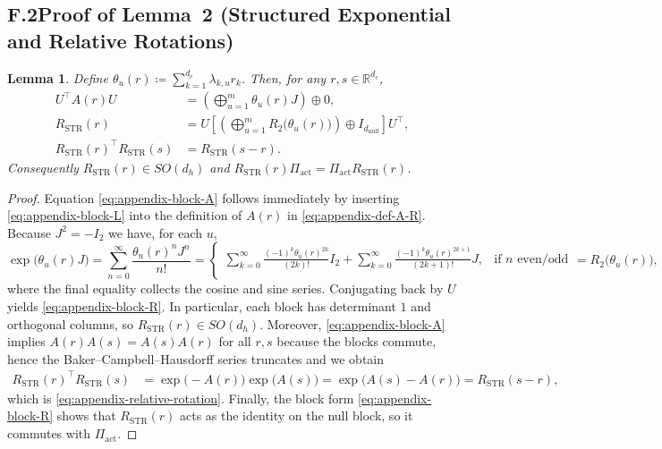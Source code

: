 \documentclass[11pt]{article}
\newcommand{\Real}{\mathbb{R}}
\newtheorem{lemma}{Lemma}
\begin{document}
\subsection*{F.2\quad Proof of Lemma~2 (Structured Exponential and Relative Rotations)}

\begin{lemma}\label{lem:appendix-structured-exponential}
Define $\theta_u(r) \coloneqq \sum_{k=1}^{d_c} \lambda_{k,u} r_k$.  Then, for any $r,s\in\Real^{d_c}$,
\begin{align}
  U^\top A(r) U
    &= \left(\bigoplus_{u=1}^{m} \theta_u(r) J\right) \oplus 0,
     \label{eq:appendix-block-A}\\
  R_{\mathrm{STR}}(r)
    &= U \left[\left(\bigoplus_{u=1}^{m} R_2\big(\theta_u(r)\big)\right) \oplus I_{d_{\mathrm{null}}}\right] U^\top,
     \label{eq:appendix-block-R}\\
  R_{\mathrm{STR}}(r)^\top R_{\mathrm{STR}}(s)
    &= R_{\mathrm{STR}}(s-r).
     \label{eq:appendix-relative-rotation}
\end{align}
Consequently $R_{\mathrm{STR}}(r)\in SO(d_h)$ and $R_{\mathrm{STR}}(r)\Pi_{\mathrm{act}} = \Pi_{\mathrm{act}} R_{\mathrm{STR}}(r)$.
\end{lemma}

\begin{proof}
Equation \eqref{eq:appendix-block-A} follows immediately by inserting \eqref{eq:appendix-block-L} into the definition
of $A(r)$ in \eqref{eq:appendix-def-A-R}.  Because $J^2 = -I_2$ we have, for each $u$,
\[
  \exp\!\big(\theta_u(r) J\big)
  = \sum_{n=0}^\infty \frac{\theta_u(r)^n J^n}{n!}
  = \begin{cases}
      \sum_{k=0}^\infty \frac{(-1)^k \theta_u(r)^{2k}}{(2k)!} I_2
        + \sum_{k=0}^\infty \frac{(-1)^k \theta_u(r)^{2k+1}}{(2k+1)!} J,
        &\text{if }n\text{ even/odd}\\[4pt]
    \end{cases}
  = R_2\big(\theta_u(r)\big),
\]
where the final equality collects the cosine and sine series.  Conjugating back by $U$ yields
\eqref{eq:appendix-block-R}.  In particular, each block has determinant $1$ and orthogonal columns, so
$R_{\mathrm{STR}}(r)\in SO(d_h)$.  Moreover, \eqref{eq:appendix-block-A} implies $A(r)A(s) = A(s)A(r)$ for
all $r,s$ because the blocks commute, hence the Baker--Campbell--Hausdorff series
truncates and we obtain
\begin{align}
  R_{\mathrm{STR}}(r)^\top R_{\mathrm{STR}}(s)
  &= \exp\!\big(-A(r)\big) \exp\!\big(A(s)\big)
   = \exp\!\big(A(s) - A(r)\big)
   = R_{\mathrm{STR}}(s-r),
\end{align}
which is \eqref{eq:appendix-relative-rotation}.  Finally, the block form \eqref{eq:appendix-block-R}
shows that $R_{\mathrm{STR}}(r)$ acts as the identity on the null block, so it commutes with
$\Pi_{\mathrm{act}}$.
\end{proof}
\end{document}
